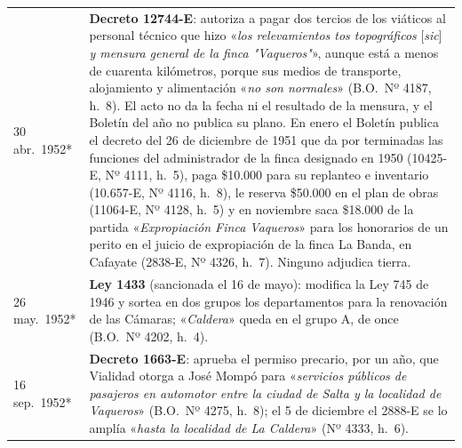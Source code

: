 \begin{longtable}{@{}p{2.7cm}p{10.3cm}@{}}
30 abr.\ 1952* & \textbf{Decreto 12744-E}: autoriza a pagar dos tercios de los viáticos al personal técnico que hizo «\textit{los relevamientos tos topográficos} [\textit{sic}] \textit{y mensura general de la finca "Vaqueros"}», aunque está a menos de cuarenta kilómetros, porque sus medios de transporte, alojamiento y alimentación «\textit{no son normales}» (B.O.\ Nº 4187, h.\ 8). El acto no da la fecha ni el resultado de la mensura, y el Boletín del año no publica su plano. En enero el Boletín publica el decreto del 26 de diciembre de 1951 que da por terminadas las funciones del administrador de la finca designado en 1950 (10425-E, Nº 4111, h.\ 5), paga \$10.000 para su replanteo e inventario (10.657-E, Nº 4116, h.\ 8), le reserva \$50.000 en el plan de obras (11064-E, Nº 4128, h.\ 5) y en noviembre saca \$18.000 de la partida «\textit{Expropiación Finca Vaqueros}» para los honorarios de un perito en el juicio de expropiación de la finca La Banda, en Cafayate (2838-E, Nº 4326, h.\ 7). Ninguno adjudica tierra. \\
26 may.\ 1952* & \textbf{Ley 1433} (sancionada el 16 de mayo): modifica la Ley 745 de 1946 y sortea en dos grupos los departamentos para la renovación de las Cámaras; «\textit{Caldera}» queda en el grupo A, de once (B.O.\ Nº 4202, h.\ 4). \\
16 sep.\ 1952* & \textbf{Decreto 1663-E}: aprueba el permiso precario, por un año, que Vialidad otorga a José Mompó para «\textit{servicios públicos de pasajeros en automotor entre la ciudad de Salta y la localidad de Vaqueros}» (B.O.\ Nº 4275, h.\ 8); el 5 de diciembre el 2888-E se lo amplía «\textit{hasta la localidad de La Caldera}» (Nº 4333, h.\ 6). \\

\end{longtable}
